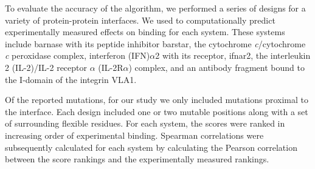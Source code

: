 To evaluate the accuracy of the \osprey \ks algorithm, we performed a series of designs for a variety of protein-protein interfaces. We used \ks to computationally predict experimentally measured effects on binding for each system. These systems include barnase with its peptide inhibitor barstar, the cytochrome {\it c}/cytochrome {\it c} peroxidase complex, interferon (IFN)$\alpha$2 with its receptor, ifnar2, the interleukin 2 (IL-2)/IL-2 receptor $\alpha$ (IL-2R$\alpha$) complex, and an antibody fragment bound to the I-domain of the integrin VLA1. 


Of the reported mutations, for our study we only included mutations proximal to the interface. Each design included one or two mutable positions along with a set of surrounding flexible residues. For each system, the \ks scores were ranked in increasing order of experimental binding. Spearman correlations were subsequently calculated for each system by calculating the Pearson correlation between the \ks score rankings and the experimentally measured rankings. 
